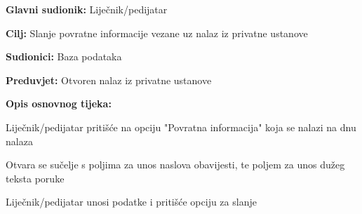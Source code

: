 					\noindent {}
					\begin{packed_item}
						
						\item \textbf{Glavni sudionik: }Liječnik/pedijatar
						\item  \textbf{Cilj:} Slanje povratne informacije vezane uz nalaz iz privatne ustanove
						\item  \textbf{Sudionici:} Baza podataka
						\item  \textbf{Preduvjet:} Otvoren nalaz iz privatne ustanove
						\item  \textbf{Opis osnovnog tijeka:}
						
						\item[] \begin{packed_enum}
							
							\item Liječnik/pedijatar pritišće na opciju "Povratna informacija" koja se nalazi na dnu nalaza
							\item Otvara se sučelje s poljima za unos naslova obavijesti, te poljem za unos dužeg teksta poruke
							\item Liječnik/pedijatar unosi podatke i pritišće opciju za slanje
						\end{packed_enum}
					\end{packed_item}
					
